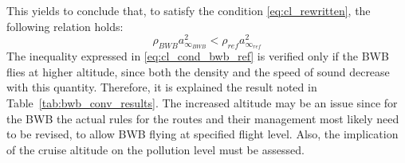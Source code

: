 This yields to conclude that, to satisfy the condition \eqref{eq:cl_rewritten}, the following relation holds:
\begin{equation}
	\label{eq:cl_cond_bwb_ref}
	\rho_{BWB}a_{\infty_{BWB}}^2 < \rho_{ref}a_{\infty_{ref}}^2
\end{equation}
The inequality expressed in \eqref{eq:cl_cond_bwb_ref} is verified only if the BWB flies at higher altitude, since both the density and the speed of sound decrease with this quantity. 
Therefore, it is explained the result noted in Table~\ref{tab:bwb_conv_results}.
The increased altitude may be an issue since for the BWB the actual rules for the routes and their management most likely need to be revised, to allow BWB flying at specified flight level. 
Also, the implication of the cruise altitude on the pollution level must be assessed. 


